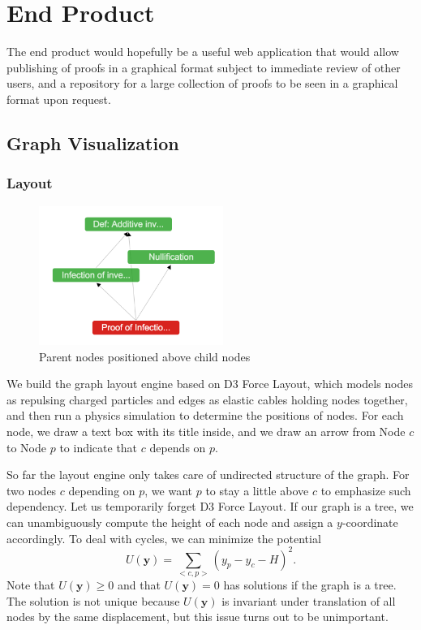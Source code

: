\documentclass{acm_proc_article-sp}
\begin{document}
\section{End Product}
The end product would hopefully be a useful web application that would
allow publishing of proofs in a graphical format subject to immediate review
of other users, and a repository for a large collection of proofs to be
seen in a graphical format upon request.
\subsection{Graph Visualization}
\subsubsection{Layout}
\begin{figure}[h!]
\centering
\includegraphics[width=6cm]{layout_1.png}
\caption{Parent nodes positioned above child nodes}
\end{figure}
We build the graph layout engine based on D3 Force Layout,
which models nodes as repulsing charged particles and edges as elastic cables holding nodes together, 
and then run a physics simulation to determine the positions of nodes.
For each node, we draw a text box with its title inside,
and we draw an arrow from Node $c$ to Node $p$ to indicate that $c$ depends on $p$.

So far the layout engine only takes care of undirected structure of the graph. 
For two nodes $c$ depending on $p$, we want $p$ to stay a little above $c$ to emphasize such dependency.
Let us temporarily forget D3 Force Layout.
If our graph is a tree, we can unambiguously compute the height of each node and assign a $y$-coordinate accordingly. 
To deal with cycles, 
we can minimize the potential
\begin{equation}
U(\mathbf{y}) = \sum_{<c,p>}\left(y_p-y_c-H\right)^2.
\end{equation}
Note that $U(\mathbf{y})\geq0$ and that $U(\mathbf{y})=0$ has solutions if the graph is a tree. 
The solution is not unique because $U(\mathbf{y})$ is invariant under translation of all nodes by the same displacement, 
but this issue turns out to be unimportant.
\end{document}
